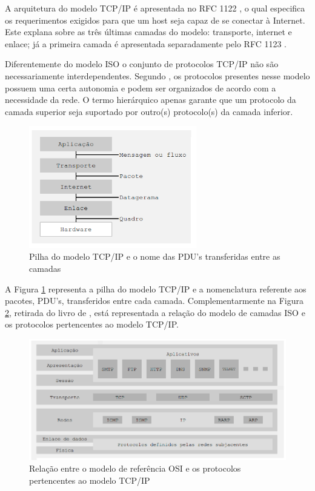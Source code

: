 A arquitetura do modelo TCP/IP é apresentada no RFC 1122 \cite{RFC1122}, o qual especifica os requerimentos exigidos para que um host seja capaz de se conectar à Internet. Este explana sobre as três últimas camadas do modelo: transporte, internet e enlace; já a primeira camada é apresentada separadamente pelo RFC 1123 \cite{RFC1123}.

Diferentemente do modelo ISO o conjunto de protocolos TCP/IP não são necessariamente interdependentes. Segundo , os protocolos presentes nesse modelo possuem uma certa autonomia e podem ser organizados de acordo com a necessidade da rede. O termo hierárquico apenas garante que um protocolo da camada superior seja suportado por outro(s) protocolo(s) da camada inferior.

\begin{figure}[H]
	\centering
    \includegraphics[width=0.65\textwidth]{04-figuras/TCPIP.png}
    \caption{Pilha do modelo TCP/IP e o nome das PDU's transferidas entre as camadas}
    \label{fig:TCPIP}
\end{figure} 

A Figura \ref{fig:TCPIP} representa a pilha do modelo TCP/IP e a nomenclatura referente aos pacotes, PDU's, transferidos entre cada camada. Complementarmente na Figura \ref{fig:relacao}, retirada do livro de , está representada a relação do modelo de camadas ISO e os protocolos pertencentes ao modelo TCP/IP. 

\begin{figure}[H]
	\centering
    \includegraphics[width=\textwidth]{04-figuras/relacao.png}
    \caption{Relação entre o modelo de referência OSI e os protocolos pertencentes ao modelo TCP/IP }
    \label{fig:relacao}
\end{figure}    


